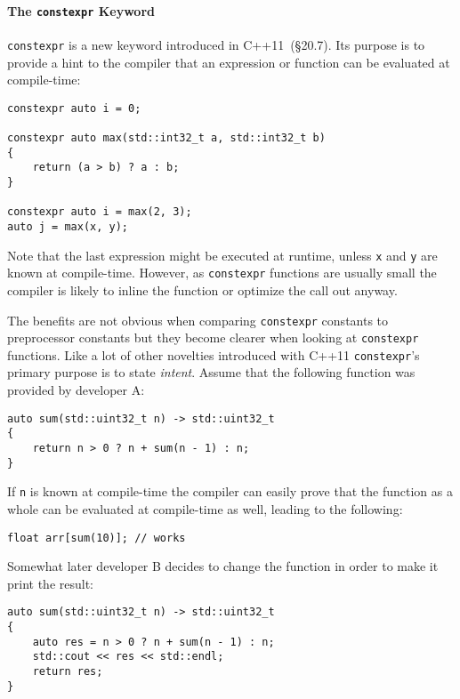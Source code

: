 \paragraph{The \texttt{constexpr} Keyword}

\texttt{constexpr} is a new keyword introduced in C++11~\cite{cpp11std}(§20.7). Its purpose is to provide a hint to the compiler that an expression or function can be evaluated at compile-time:

\begin{verbatim}
constexpr auto i = 0;

constexpr auto max(std::int32_t a, std::int32_t b)
{
    return (a > b) ? a : b;
}

constexpr auto i = max(2, 3);
auto j = max(x, y);
\end{verbatim}

\noindent Note that the last expression might be executed at runtime, unless \texttt{x} and \texttt{y} are known at compile-time. However, as \texttt{constexpr} functions are usually small the compiler is likely to inline the function or optimize the call out anyway.

The benefits are not obvious when comparing \texttt{constexpr} constants to preprocessor constants but they become clearer when looking at \texttt{constexpr} functions. Like a lot of other novelties introduced with C++11 \texttt{constexpr}'s primary purpose is to state \textit{intent}. Assume that the following function was provided by developer A:

\begin{verbatim}
auto sum(std::uint32_t n) -> std::uint32_t
{
    return n > 0 ? n + sum(n - 1) : n;
}
\end{verbatim}

\noindent If \texttt{n} is known at compile-time the compiler can easily prove that the function as a whole can be evaluated at compile-time as well, leading to the following:

\begin{verbatim}
float arr[sum(10)]; // works
\end{verbatim}

\noindent Somewhat later developer B decides to change the function in order to make it print the result:

\begin{verbatim}
auto sum(std::uint32_t n) -> std::uint32_t
{
    auto res = n > 0 ? n + sum(n - 1) : n;
    std::cout << res << std::endl;
    return res;
}
\end{verbatim}

